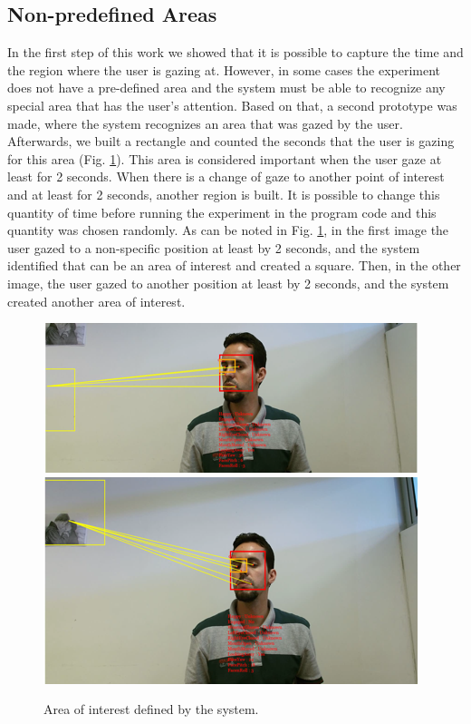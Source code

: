 \documentclass[10pt, conference]{IEEEtran}
\begin{document}
\subsection{Non-predefined Areas}

	In the first step of this work we showed that it is possible to capture the time and the region where the user is gazing at. 
	However, in some cases the experiment does not have a pre-defined area and the system must be able to recognize any special area that has the user's attention. 
	Based on that, a second prototype was made, where the system recognizes an area that was gazed by the user. 
	Afterwards, we built a rectangle and counted the seconds that the user is gazing for this area (Fig. \ref{fig:fig9}). 
	This area is considered important when the user gaze at least for 2 seconds. 
	When there is a change of gaze to another point of interest and at least for 2 seconds, another region is built. It is possible to change this quantity of time before running the experiment in the program code and this quantity was chosen randomly.
	As can be noted in Fig. \ref{fig:fig9}, in the first image the user gazed to a non-specific position at least by 2 seconds, and the system identified that can be an area of interest and created a square. 
	Then, in the other image, the user gazed to another position at least by 2 seconds, and the system created another area of interest. 

    \begin{figure}[t]
        \centering
        \includegraphics{figures/pic9a.png}\\
        \includegraphics{figures/pic9b.png}\\    
        \caption{Area of interest defined by the system.}
        \label{fig:fig9}
    \end{figure}
\end{document}
